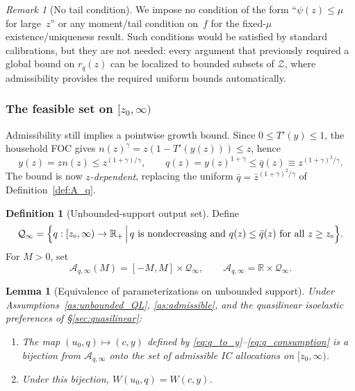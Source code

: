 \documentclass[12pt,a4paper]{article}
\theoremstyle{definition}
\newtheorem{definition}{Definition}[section]
\theoremstyle{plain}
\newtheorem{lemma}{Lemma}[section]
\theoremstyle{remark}
\newtheorem{remark}{Remark}[section]
\newcommand{\R}{\mathbb{R}}
\newcommand{\zbar}{\bar{z}}
\newcommand{\zlow}{z_{\scriptscriptstyle 0}}
\newcommand{\calZ}{\mathcal{Z}}
\begin{document}
\begin{remark}[No tail condition]
\label{rem:no_tail_unbounded}
We impose no condition of the form
``$\psi(z) \leq \mu$ for large~$z$'' or any moment/tail
condition on~$f$ for the fixed-$\mu$ existence/uniqueness
result.  Such conditions would be satisfied by standard
calibrations, but they are not needed: every argument that
previously required a global bound on $r_q(z)$ can be
localized to bounded subsets of $\calZ$, where admissibility
provides the required uniform bounds automatically.
\end{remark}


\subsubsection{The feasible set on $[\zlow,\infty)$}

Admissibility still implies a pointwise growth bound.  Since
$0 \leq T'(y) \leq 1$, the household FOC gives
$n(z)^\gamma = z(1-T'(y(z))) \leq z$, hence
\[
  y(z) = z n(z) \leq z^{(1+\gamma)/\gamma},
  \qquad
  q(z) = y(z)^{1+\gamma} \leq \bar q(z)
  \equiv z^{(1+\gamma)^2/\gamma}.
\]
The bound is now \emph{$z$-dependent}, replacing the uniform
$\bar q = \zbar^{(1+\gamma)^2/\gamma}$ of
Definition~\ref{def:A_q}.

\begin{definition}[Unbounded-support output set]
\label{def:A_q_unbounded}
Define
\[
  \mathcal{Q}_\infty
  = \Bigl\{q : [\zlow,\infty) \to \R_+ \,\Big|\,
  q \text{ is nondecreasing and }
  q(z) \leq \bar q(z) \text{ for all } z \geq \zlow\Bigr\}.
\]
For $M > 0$, set
\[
  \mathcal{A}_{q,\infty}(M) = [-M,M] \times \mathcal{Q}_\infty,
  \qquad
  \mathcal{A}_{q,\infty} = \R \times \mathcal{Q}_\infty.
\]
\end{definition}

\begin{lemma}[Equivalence of parameterizations on unbounded support]
\label{lem:Aq_equiv_unbounded}
Under Assumptions~\ref{as:unbounded_QL},
\ref{as:admissible}, and the quasilinear isoelastic preferences of
\S\ref{sec:quasilinear}:
\begin{enumerate}[label=(\roman*)]
\item The map $(u_0,q) \mapsto (c,y)$ defined by
  \eqref{eq:q_to_y}--\eqref{eq:q_consumption} is a bijection from
  $\mathcal{A}_{q,\infty}$ onto the set of admissible IC allocations
  on $[\zlow,\infty)$.
\item Under this bijection, $W(u_0,q) = W(c,y)$.
\end{enumerate}
\end{lemma}
\end{document}
